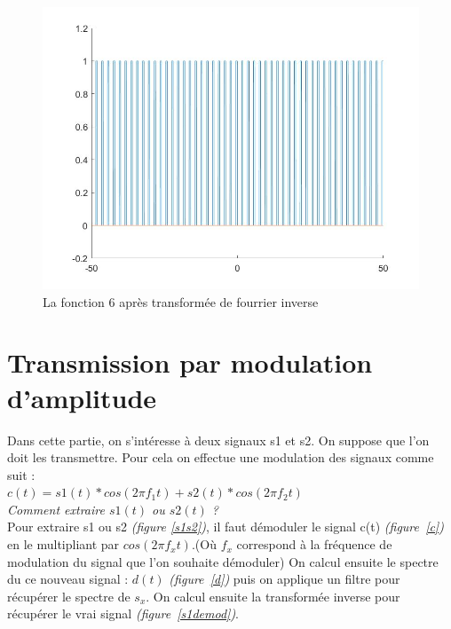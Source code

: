\documentclass[10pt,a4paper]{article}
\begin{document}
\begin{figure}[H] \begin{center}
\includegraphics[scale=0.35]{fct6.jpg}
\caption{La fonction 6 après transformée de fourrier inverse}
\end{center} \end{figure}


\newpage
\bigskip
\section{Transmission par modulation d'amplitude}
Dans cette partie, on s'intéresse à deux signaux s1 et s2. On suppose que l'on doit les transmettre. Pour cela on effectue une modulation des signaux comme suit :\\
$c(t) = s1(t)*cos(2 \pi f_1 t)+ s2(t)*cos(2 \pi f_2 t)$\\

\textit{Comment extraire $s1(t)$ ou $s2(t)$ ?}\\
Pour extraire s1 ou s2 \textit{(figure \ref{s1s2})}, il faut démoduler le signal c(t) \textit{(figure~\ref{c})} en le multipliant par $cos(2 \pi f_x t)$.(Où $f_x$ correspond à la fréquence de modulation du signal que l'on souhaite démoduler) On calcul ensuite le spectre du ce nouveau signal : $d(t)$ \textit{(figure~\ref{d})} puis on applique un filtre pour récupérer le spectre de $s_x$. On calcul ensuite la transformée inverse pour récupérer le vrai signal \textit{(figure~\ref{s1demod})}.
\end{document}
